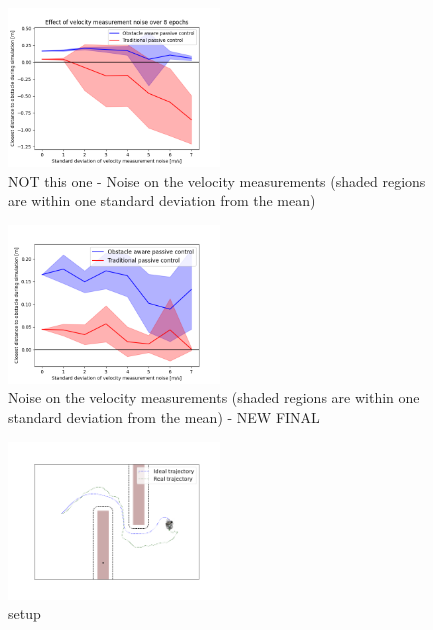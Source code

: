 \begin{figure}
\centerline{\includegraphics[width=0.5\textwidth]{figures/vel_noise_0.png}}
\caption{ NOT this one - Noise on the velocity measurements (shaded regions are within one standard deviation from the mean)}
\label{fig_vel_noise}
\end{figure}

\begin{figure}
\centerline{\includegraphics[width=0.5\textwidth]{figures/vel_noise_cliped_0.png}}
\caption{Noise on the velocity measurements (shaded regions are within one standard deviation from the mean) - NEW FINAL }
\label{fig_vel_noise}
\end{figure}

\begin{figure}
\centerline{\includegraphics[width=0.5\textwidth]{figures/noise_setup.png}}
\caption{setup}
\label{fig_vel_noise}
\end{figure}


